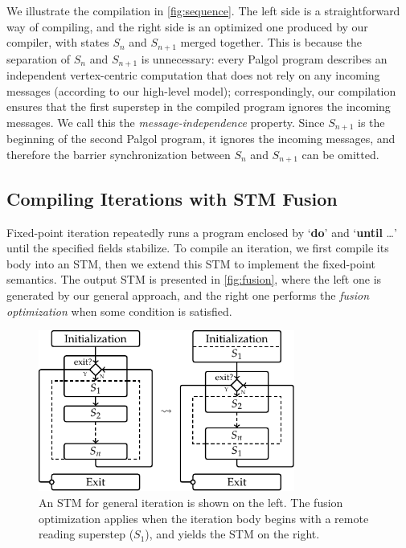 \documentclass{sokendai_thesis} %
\begin{document}
We illustrate the compilation in \autoref{fig:sequence}.
The left side is a straightforward way of compiling, and the right side is an optimized one produced by our compiler, with states $S_n$ and $S_{n+1}$ merged together.
This is because the separation of $S_n$ and $S_{n+1}$ is unnecessary:
every Palgol program describes an independent vertex-centric computation that does not rely on any incoming messages (according to our high-level model); correspondingly, our compilation ensures that the first superstep in the compiled program ignores the incoming messages.
We call this the \emph{message-independence} property.
Since $S_{n+1}$ is the beginning of the second Palgol program, it ignores the incoming messages, and therefore the barrier synchronization between $S_n$ and $S_{n+1}$ can be omitted.

\subsection{Compiling Iterations with STM Fusion}

Fixed-point iteration repeatedly runs a program enclosed by `\textbf{do}' and `\textbf{until} \ldots' until the specified fields stabilize.
To compile an iteration, we first compile its body into an STM, then we extend this STM to implement the fixed-point semantics.
The output STM is presented in \autoref{fig:fusion}, where the left one is generated by our general approach, and the right one performs the \emph{fusion optimization} when some condition is satisfied.

\begin{figure}[h]
 \centering
 \includegraphics[width=0.75\textwidth]{figures/stm-opt.pdf}
 \caption{An STM for general iteration is shown on the left. The fusion optimization applies when the iteration body begins with a remote reading superstep ($S_1$), and yields the STM on the right.}
 \label{fig:fusion}
\vspace{-2ex}\end{figure}
\end{document}
